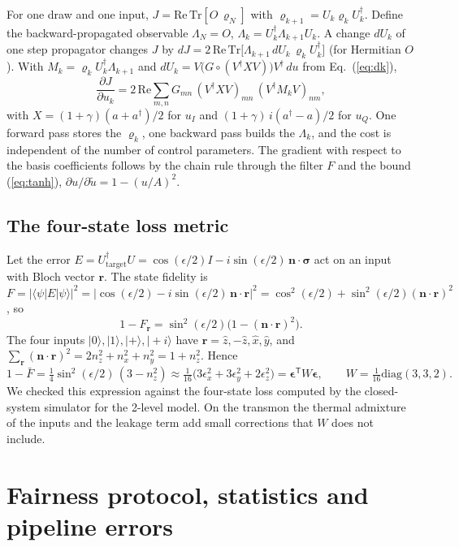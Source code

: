\documentclass[aps,pra,onecolumn,notitlepage,superscriptaddress,nofootinbib,floatfix]{revtex4-2}
\begin{document}
For one draw and one input, $J=\mathrm{Re}\,\mathrm{Tr}[O\,\varrho_N]$ with
$\varrho_{k+1}=U_k\varrho_kU_k^\dagger$. Define the backward-propagated
observable $\Lambda_{N}=O$, $\Lambda_k=U_k^\dagger\Lambda_{k+1}U_k$. A change
$dU_k$ of one step propagator changes $J$ by
$dJ=2\,\mathrm{Re}\,\mathrm{Tr}\big[\Lambda_{k+1}\,dU_k\,\varrho_kU_k^\dagger\big]$
(for Hermitian $O$). With $M_k=\varrho_kU_k^\dagger\Lambda_{k+1}$ and
$dU_k=V\big(G\circ(V^\dagger XV)\big)V^\dagger\,du$ from Eq.~(\ref{eq:dk}),
\[
\frac{\partial J}{\partial u_k}=2\,\mathrm{Re}\sum_{m,n}G_{mn}\,(V^\dagger XV)_{mn}\,(V^\dagger M_kV)_{nm},
\]
with $X=(1+\gamma)(a+a^\dagger)/2$ for $u_I$ and $(1+\gamma)\,i(a^\dagger-a)/2$
for $u_Q$. One forward pass stores the $\varrho_k$, one backward pass builds
the $\Lambda_k$, and the cost is independent of the number of control
parameters. The gradient with respect to the basis coefficients follows by
the chain rule through the filter $F$ and the bound (\ref{eq:tanh}),
$\partial u/\partial\tilde u=1-(u/A)^2$.

\subsection{The four-state loss metric}
\label{sec:W}

Let the error $E=U_{\mathrm{target}}^\dagger U=\cos(\epsilon/2)I-i\sin(\epsilon/2)\,\mathbf n\cdot\boldsymbol\sigma$
act on an input with Bloch vector $\mathbf r$. The state fidelity is
$F=|\langle\psi|E|\psi\rangle|^2=|\cos(\epsilon/2)-i\sin(\epsilon/2)\,\mathbf n\cdot\mathbf r|^2
=\cos^2(\epsilon/2)+\sin^2(\epsilon/2)(\mathbf n\cdot\mathbf r)^2$, so
\[
1-F_{\mathbf r}=\sin^2(\epsilon/2)\big(1-(\mathbf n\cdot\mathbf r)^2\big).
\]
The four inputs $|0\rangle,|1\rangle,|{+}\rangle,|{+}i\rangle$ have
$\mathbf r=\hat z,-\hat z,\hat x,\hat y$, and
$\sum_{\mathbf r}(\mathbf n\cdot\mathbf r)^2=2n_z^2+n_x^2+n_y^2=1+n_z^2$. Hence
\[
1-\bar F=\tfrac14\sin^2(\epsilon/2)\,(3-n_z^2)
\approx\tfrac1{16}\big(3\epsilon_x^2+3\epsilon_y^2+2\epsilon_z^2\big)
=\boldsymbol\epsilon^{\mathsf T}W\boldsymbol\epsilon,\qquad W=\tfrac1{16}\mathrm{diag}(3,3,2).
\]
We checked this expression against the four-state loss computed by the
closed-system simulator for the 2-level model. On the transmon the thermal
admixture of the inputs and the leakage term add small corrections that $W$
does not include.


\section{Fairness protocol, statistics and pipeline errors}
\label{sec:fairnessall}
\end{document}

